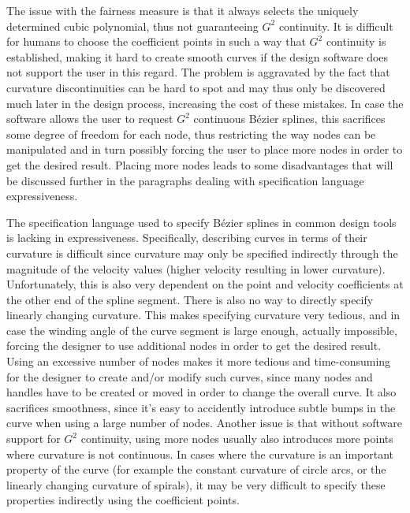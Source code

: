 \documentclass[a4paper]{article}
\begin{document}
				The issue with the fairness measure is that it always selects the uniquely determined cubic polynomial, thus not guaranteeing \(G^2\) continuity. It is difficult for humans to choose the coefficient points in such a way that \(G^2\) continuity is established, making it hard to create smooth curves if the design software does not support the user in this regard. The problem is aggravated by the fact that curvature discontinuities can be hard to spot and may thus only be discovered much later in the design process, increasing the cost of these mistakes. In case the software allows the user to request \(G^2\) continuous Bézier splines, this sacrifices some degree of freedom for each node, thus restricting the way nodes can be manipulated and in turn possibly forcing the user to place more nodes in order to get the desired result. Placing more nodes leads to some disadvantages that will be discussed further in the paragraphs dealing with specification language expressiveness.

				The specification language used to specify Bézier splines in common design tools is lacking in expressiveness. Specifically, describing curves in terms of their curvature is difficult since curvature may only be specified indirectly through the magnitude of the velocity values (higher velocity resulting in lower curvature). Unfortunately, this is also very dependent on the point and velocity coefficients at the other end of the spline segment. There is also no way to directly specify linearly changing curvature. This makes specifying curvature very tedious, and in case the winding angle of the curve segment is large enough, actually impossible, forcing the designer to use additional nodes in order to get the desired result. Using an excessive number of nodes makes it more tedious and time-consuming for the designer to create and/or modify such curves, since many nodes and handles have to be created or moved in order to change the overall curve. It also sacrifices smoothness, since it's easy to accidently introduce subtle bumps in the curve when using a large number of nodes. Another issue is that without software support for \(G^2\) continuity, using more nodes usually also introduces more points where curvature is not continuous. In cases where the curvature is an important property of the curve (for example the constant curvature of circle arcs, or the linearly changing curvature of spirals), it may be very difficult to specify these properties indirectly using the coefficient points.
\end{document}
